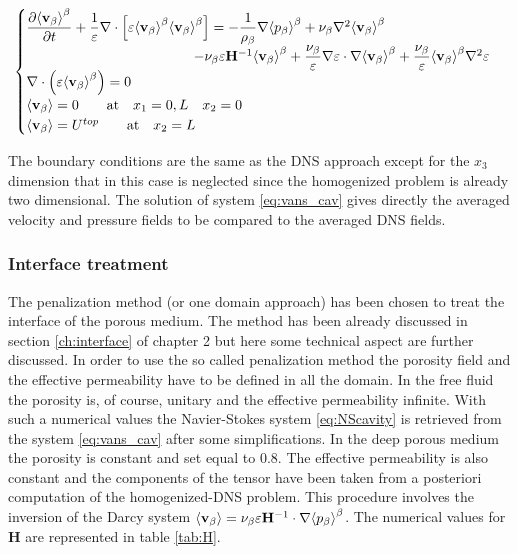\begin{eqnarray}
\begin{cases}
\dfrac{\partial {\left< \textbf{v}_{\beta} \right>}^{\beta}}{\partial t} + \dfrac{1}{\varepsilon} \nabla \cdot \left[ \varepsilon {\left< \textbf{v}_{\beta} \right>}^{\beta}  {\left< \textbf{v}_{\beta} \right>}^{\beta} \right] = -\dfrac{1}{\rho_{\beta}} \nabla {\left< p_{\beta}\right>}^{\beta} + \nu_{\beta} \nabla^2 {\left< \textbf{v}_{\beta} \right>}^{\beta} \\ 
\qquad \qquad \qquad \qquad \qquad \qquad- \nu_{\beta} \varepsilon \mathbf{H}^{-1} {\left< \textbf{v}_{\beta} \right>}^{\beta} +\dfrac{\nu_{\beta}}{\varepsilon} \nabla \varepsilon \cdot \nabla {\left< \textbf{v}_{\beta} \right>}^{\beta} + \dfrac{\nu_{\beta}}{\varepsilon} {\left< \textbf{v}_{\beta} \right>}^{\beta} \nabla^2 \varepsilon \\
\nabla \cdot \left(\varepsilon {\left< \textbf{v}_{\beta} \right>}^{\beta} \right) = 0\\
{\left< \textbf{v}_{\beta} \right>} = 0 \qquad \textrm{at} \quad x_1 = 0,L \quad x_2 = 0\\
{\left< \textbf{v}_{\beta} \right>} = U^{top} \qquad \textrm{at} \quad x_2 = L
\label{eq:vans_cav}
\end{cases}
\end{eqnarray}

The boundary conditions are the same as the DNS approach except for the $x_3$ dimension that in this case is neglected since the homogenized problem is already two dimensional.
The solution of system \eqref{eq:vans_cav} gives directly the averaged velocity and pressure fields to be compared to the averaged DNS fields.

\subsubsection{Interface treatment}
The penalization method (or one domain approach) has been chosen to treat the interface of the porous medium.
The method has been already discussed in section \ref{ch:interface}  of chapter 2 but here some technical aspect are further discussed.
In order to use the so called penalization method the porosity field and the effective permeability have to be defined in all the domain. In the free fluid the porosity is, of course, unitary and the effective permeability infinite. With such a numerical values the Navier-Stokes system \eqref{eq:NScavity} is retrieved from the system \eqref{eq:vans_cav} after some simplifications.
In the deep porous medium the porosity is constant and set equal to $0.8$. The effective permeability is also constant and the components of the tensor have been taken from a posteriori computation of the homogenized-DNS problem. This procedure involves the inversion of the Darcy system ${\left< \textbf{v}_{\beta} \right>} = \nu_{\beta} \varepsilon \mathbf{H}^{-1} \cdot \nabla {\left< p_{\beta}\right>}^{\beta}$. The numerical values for $\mathbf{H}$ are represented in table \ref{tab:H}.


